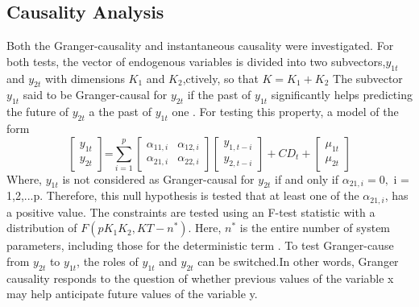 \subsection{Causality Analysis} Both the Granger-causality and instantaneous causality were investigated. For both tests, the vector of endogenous variables is divided into two subvectors,$y_{1t}$ and $y_{2t}$ with dimensions $K_{1}$ and $K_{2}$,ctively, so that $K = K_{1} + K_{2}$ The subvector $y_{1t}$ said to be Granger-causal for
$y_{2t}$ if the past of $y_{1t}$ significantly helps predicting the future of $y_{2t}$ a the past of $y_{1t}$ one \parencite{granger1969investigating}. For testing this property,
a model of the form
\begin{equation}
	\displaystyle
	\left[ \begin{array}{c} y_{1t} \\ y_{2t}  \end{array} \right] \mbox{=} \sum_{i=1}^{p}\left[\begin{array}{cc}
		\alpha_{11,i} & \alpha_{12,i} \\
		\alpha_{21,i} & \alpha_{22,i} 
	\end{array}
\right]
\left[\begin{array}{c}
		y_{1,t-i}\\
		y_{2,t-i}
	\end{array}\right] + CD_{t} + \left[ \begin{array}{c}
		\mu_{1t}\\
		\mu_{2t}
	\end{array}\right]
\end{equation}
Where, $y_{1t}$ is not considered as  Granger-causal for $y_{2t}$ if and only if $ \alpha_{21,i} = 0,$ i = 1,2,...p.
Therefore, this null hypothesis is tested that at least one of the $\alpha_{21,i}$, has a positive value. The constraints are tested using an F-test statistic with a distribution of $F(pK_{1}K_{2}, KT - n^{*})$. Here, $n^{*}$ is the entire number of system parameters, including those for the deterministic term \parencite{lutkepohl2005new}. To test Granger-cause from $y_{2t}$ to $y_{1t}$, the roles of $y_{1t}$ and $y_{2t}$ can be switched.In other words, Granger causality responds to the question of whether previous values of the variable x may help anticipate future values of the variable y.

